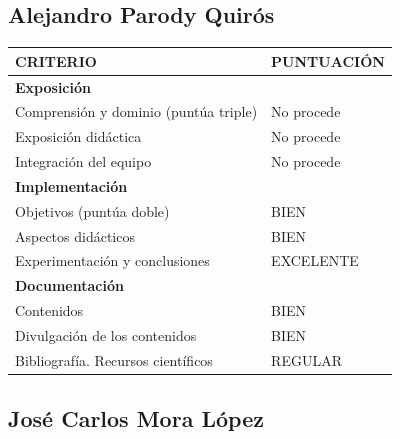 \documentclass[a4paper]{article}
\begin{document}
\subsection{Alejandro Parody Quirós}

\begin{table}[h!]
	\centering
	\begin{tabular}{|l|l|}
		\hline
		\textbf{CRITERIO} & \textbf{PUNTUACIÓN} \\ \hline
		
		\multicolumn{2}{|l|}{\textbf{Exposición}} \\ \hline
		Comprensión y dominio (puntúa triple) & No procede \\ \hline
		Exposición didáctica & No procede \\ \hline
		Integración del equipo & No procede \\ \hline
		
		\multicolumn{2}{|l|}{\textbf{Implementación}} \\ \hline
		Objetivos (puntúa doble) & BIEN \\ \hline
		Aspectos didácticos & BIEN \\ \hline
		Experimentación y conclusiones & EXCELENTE \\ \hline
		
		\multicolumn{2}{|l|}{\textbf{Documentación}} \\ \hline
		Contenidos & BIEN \\ \hline
		Divulgación de los contenidos & BIEN \\ \hline
		Bibliografía. Recursos científicos & REGULAR \\ \hline
		
	\end{tabular}
\end{table}

\subsection{José Carlos Mora López}
\end{document}
